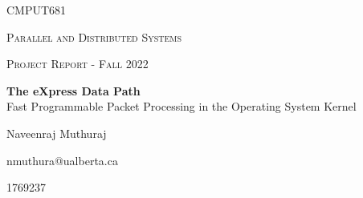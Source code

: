 \begin{titlepage}
    \begin{center}
        \vspace*{1cm}


        {\scshape\Large CMPUT681\par}
        {\scshape\LARGE Parallel and Distributed Systems\par}   
        \vspace{0.5cm}
        {\scshape\Large Project Report - Fall 2022\par}
        \vfill
        
        \Huge
        \textbf{The eXpress Data Path\\}
        \LARGE
        Fast Programmable Packet Processing in the Operating System Kernel

        \vfill

        {\Large Naveenraj Muthuraj\par}
        {\Large nmuthura@ualberta.ca \par}
        {\Large 1769237 \par}

    \end{center}
\end{titlepage}